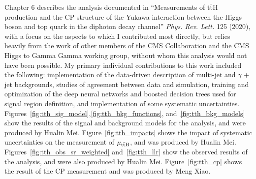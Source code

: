 Chapter 6 describes the \ttH analysis documented in ``Measurements of $\mathrm{t\bar{t}}$H production and the CP structure of the Yukawa interaction between the Higgs boson and top quark in the diphoton decay channel'' \emph{Phys. Rev. Lett.} 125 (2020), with a focus on the aspects to which I contributed most directly, but relies heavily from the work of other members of the CMS Collaboration and the CMS Higgs to Gamma Gamma working group, without whom this analysis would not have been possible.
My primary individual contributions to this work included the following: implementation of the data-driven description of multi-jet and $\gamma$ + jet backgrounds, studies of agreement between data and simulation, training and optimization of the deep neural networks and boosted decision trees used for signal region definition, and implementation of some systematic uncertainties.
Figures~\ref{fig:tth_sig_model},\ref{fig:tth_bkg_functions}, and~\ref{fig:tth_bkg_models} show the results of the signal and background models for the \ttH analysis, and were produced by Hualin Mei.
Figure~\ref{fig:tth_impacts} shows the impact of systematic uncertainties on the measurement of $\mu_{\mathrm{t\bar{t}H}}$, and was produced by Hualin Mei.
Figures~\ref{fig:tth_obs_sr_weighted} and~\ref{fig:tth_llr} show the observed results of the \ttH analysis, and were also produced by Hualin Mei.
Figure~\ref{fig:tth_cp} shows the result of the \ttH CP measurement and was produced by Meng Xiao.

